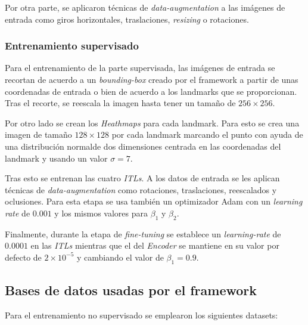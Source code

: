                     \medskip

                    \noindent Por otra parte, se aplicaron técnicas de \textit{data-augmentation} a las imágenes de entrada como giros horizontales, traslaciones, \textit{resizing} o rotaciones.

                \subsubsection*{Entrenamiento supervisado}
                    \noindent Para el entrenamiento de la parte supervisada, las imágenes de entrada se recortan de acuerdo a un \textit{bounding-box} creado por el framework a partir de unas coordenadas de entrada o bien de acuerdo a los landmarks que se proporcionan. Tras el recorte, se reescala la imagen hasta tener un tamaño de $256\times256$. 
                    
                    \medskip

                    \noindent Por otro lado se crean los \textit{Heathmaps} para cada landmark. Para esto se crea una imagen de tamaño $128 \times 128$ por cada landmark marcando el punto con ayuda de una distribución normalde dos dimensiones centrada en las coordenadas del landmark y usando un valor $\sigma=7$.

                    \medskip

                    \noindent Tras esto se entrenan las cuatro \textit{ITLs}. A los datos de entrada se les aplican técnicas de \textit{data-augmentation} como rotaciones, traslaciones, reescalados y oclusiones. Para esta etapa se usa también un optimizador Adam con un \textit{learning rate} de $0.001$ y los mismos valores para $\beta_1$ y $\beta_2$.

                    \medskip

                    \noindent Finalmente, durante la etapa de \textit{fine-tuning} se establece un \textit{learning-rate} de $0.0001$ en las \textit{ITLs} mientras que el del \textit{Encoder} se mantiene en su valor por defecto de $2 \times 10^{-5}$ y cambiando el valor de $\beta_1 = 0.9$.

            \subsection{Bases de datos usadas por el framework}
                
                \noindent Para el entrenamiento no supervisado se emplearon los siguientes datasets: 


